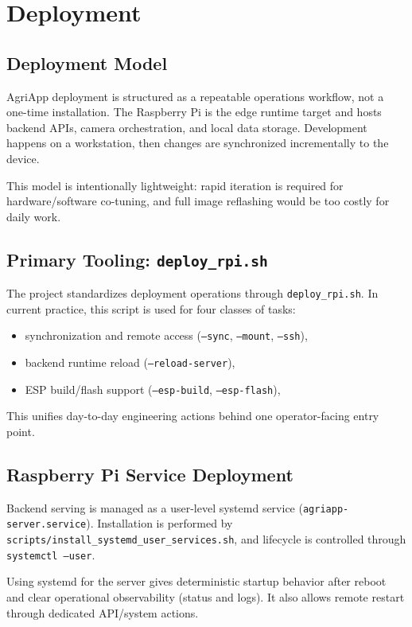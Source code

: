 \section{Deployment}

\subsection{Deployment Model}
AgriApp deployment is structured as a repeatable operations workflow, not a one-time installation. The Raspberry Pi is the edge runtime target and hosts backend APIs, camera orchestration, and local data storage. Development happens on a workstation, then changes are synchronized incrementally to the device.

This model is intentionally lightweight: rapid iteration is required for hardware/software co-tuning, and full image reflashing would be too costly for daily work.

\subsection{Primary Tooling: \texttt{deploy\_rpi.sh}}
The project standardizes deployment operations through \texttt{deploy\_rpi.sh}. In current practice, this script is used for four classes of tasks:
\begin{itemize}
  \item synchronization and remote access (\texttt{--sync}, \texttt{--mount}, \texttt{--ssh}),
  \item backend runtime reload (\texttt{--reload-server}),
  \item ESP build/flash support (\texttt{--esp-build}, \texttt{--esp-flash}),
\end{itemize}

This unifies day-to-day engineering actions behind one operator-facing entry point.

\subsection{Raspberry Pi Service Deployment}
Backend serving is managed as a user-level systemd service (\texttt{agriapp-server.service}). Installation is performed by \texttt{scripts/install\_systemd\_user\_services.sh}, and lifecycle is controlled through \texttt{systemctl --user}.

Using systemd for the server gives deterministic startup behavior after reboot and clear operational observability (status and logs). It also allows remote restart through dedicated API/system actions.

